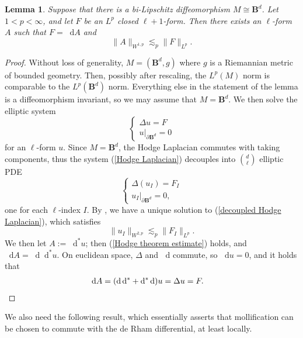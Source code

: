 \documentclass[reqno,11pt]{amsart}
\newcommand{\Ball}{\mathbf{B}}
\newcommand*\dif{\mathop{}\!\mathrm{d}}
\newtheorem{lemma}[theorem]{Lemma}
\theoremstyle{definition}
\numberwithin{equation}{section}
\begin{document}
\begin{lemma}\label{Hodge theorem}
Suppose that there is a bi-Lipschitz diffeomorphism $M \cong \Ball^d$.
Let $1 < p < \infty$, and let $F$ be an $L^p$ closed $\ell + 1$-form.
Then there exists an $\ell$-form $A$ such that $F = \dif A$ and
\begin{equation}\label{Hodge theorem estimate}
\|A\|_{W^{1, p}} \lesssim_p \|F\|_{L^p}.
\end{equation}
\end{lemma}
\begin{proof}
Without loss of generality, $M = (\Ball^d, g)$ where $g$ is a Riemannian metric of bounded geometry.
Then, possibly after rescaling, the $L^p(M)$ norm is comparable to the $L^p(\Ball^d)$ norm.
Everything else in the statement of the lemma is a diffeomorphism invariant, so we may assume that $M = \Ball^d$.
We then solve the elliptic system 
\begin{equation}\label{Hodge Laplacian}
\begin{cases}
	\Delta u = F \\
	u|_{\partial \Ball^d} = 0
\end{cases}
\end{equation}
for an $\ell$-form $u$.
Since $M = \Ball^d$, the Hodge Laplacian commutes with taking components, thus the system (\ref{Hodge Laplacian}) decouples into $\binom d\ell$ elliptic PDE
\begin{equation}\label{decoupled Hodge Laplacian}
\begin{cases}
\Delta(u_I) = F_I \\
u_I|_{\partial \Ball^d} = 0,
\end{cases}
\end{equation}
one for each $\ell$-index $I$.
By \cite[Chapter 3, Theorem 6.3]{chen1998second}, we have a unique solution to (\ref{decoupled Hodge Laplacian}), which satisfies
$$\|u_I\|_{W^{2, p}} \lesssim_p \|F_I\|_{L^p}.$$
We then let $A := \dif^* u$; then (\ref{Hodge theorem estimate}) holds, and $\dif A = \dif \dif^* u$.
On euclidean space, $\Delta$ and $\dif$ commute, so $\dif u = 0$, and it holds that 
\begin{align*}
\dif A &= (\dif \dif^* + \dif^* \dif) u = \Delta u = F. \qedhere 
\end{align*}
\end{proof}

We also need the following result, which essentially asserts that mollification can be chosen to commute with the de Rham differential, at least locally.
\end{document}
